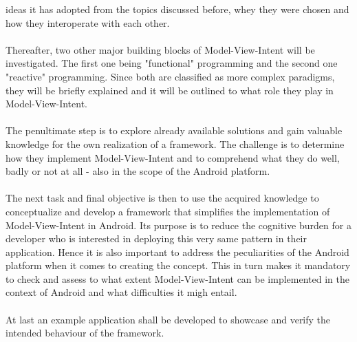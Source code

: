 ideas it has adopted from the topics discussed before, whey they were chosen and how they interoperate with each other.
\\
\\
Thereafter, two other major building blocks of Model-View-Intent will be investigated. The first one being "functional" programming and the second one "reactive" programming.
Since both are classified as more complex paradigms, they will be briefly explained and it will be outlined to what role they play in Model-View-Intent.
\\
\\
The penultimate step is to explore already available solutions and gain valuable knowledge for the own realization of a framework. The challenge is to determine
how they implement Model-View-Intent and to comprehend what they do well, badly or not at all - also in the scope of the Android platform.
\\
\\
The next task and final objective is then to use the acquired knowledge to conceptualize and develop a framework that simplifies the implementation of Model-View-Intent in Android. 
Its purpose is to reduce the cognitive burden for a developer who is interested in deploying this very same pattern in their application. Hence it is also important to address the 
peculiarities of the Android platform when it comes to creating the concept. This in turn makes it mandatory to check and assess to what extent Model-View-Intent can be implemented 
in the context of Android and what difficulties it migh entail.
\\
\\
At last an example application shall be developed to showcase and verify the intended behaviour of the framework.